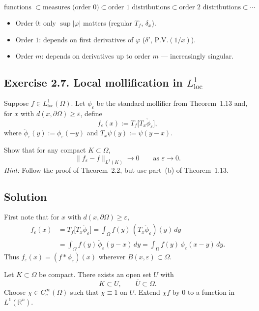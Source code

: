 \documentclass[12pt,a4paper]{article}
\theoremstyle{plain}
\theoremstyle{definition}
\theoremstyle{remark}
\theoremstyle{remark}
\begin{document}
\[
\text{functions } \subset
\text{measures (order $0$)} \subset
\text{order $1$ distributions} \subset
\text{order $2$ distributions} \subset \cdots
\]

\begin{itemize}
	\item Order $0$: only $\sup|\varphi|$ matters (regular $T_f$, $\delta_x$).  
	\item Order $1$: depends on first derivatives of $\varphi$ ($\delta'$, $\mathrm{P.V.}(1/x)$).  
	\item Order $m$: depends on derivatives up to order $m$ — increasingly singular.
\end{itemize}

\clearpage

\subsection*{Exercise 2.7. Local mollification in $L^1_{\mathrm{loc}}$}

Suppose $f\in L^1_{\mathrm{loc}}(\Omega)$.  
Let $\phi_\varepsilon$ be the standard mollifier from Theorem~1.13 and,
for $x$ with $d(x,\partial\Omega)\ge\varepsilon$, define
\[
f_\varepsilon(x)
:= T_f\bigl[T_x \check{\phi}_\varepsilon\bigr],
\]
where $\check{\phi}_\varepsilon(y):=\phi_\varepsilon(-y)$ and
$T_x\psi(y):=\psi(y-x)$.

\medskip\noindent
Show that for any compact $K\subset\Omega$,
\[
\|f_\varepsilon - f\|_{L^1(K)} \longrightarrow 0
\qquad\text{as }\varepsilon\to0.
\]
\emph{Hint:} Follow the proof of Theorem~2.2, but use part~(b) of
Theorem~1.13.

\subsection*{Solution}
	First note that for $x$ with $d(x,\partial\Omega)\ge\varepsilon$,
	\begin{align*}
		f_\varepsilon(x)
		&= T_f\bigl[T_x \check{\phi}_\varepsilon\bigr]
		= \int_\Omega f(y)\,(T_x\check{\phi}_\varepsilon)(y)\,dy \\
		&= \int_\Omega f(y)\,\check{\phi}_\varepsilon(y-x)\,dy
		= \int_\Omega f(y)\,\phi_\varepsilon(x-y)\,dy.
	\end{align*}
	Thus $f_\varepsilon(x)=(f*\phi_\varepsilon)(x)$ wherever
	$B(x,\varepsilon)\subset\Omega$.
	
	Let $K\subset\Omega$ be compact. There exists an open set $U$ with
	\[
	K\subset U,\qquad \overline{U}\subset\Omega.
	\]
	Choose $\chi\in C_c^\infty(\Omega)$ such that $\chi\equiv1$ on $U$.
	Extend $\chi f$ by $0$ to a function in $L^1(\mathbb{R}^n)$.
	
\end{document}
